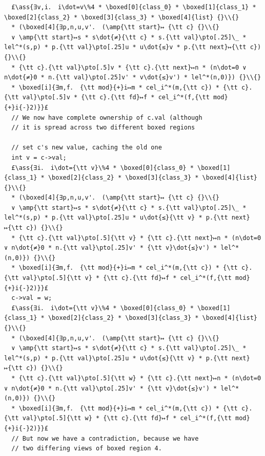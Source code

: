 \documentclass[12pt,a4paper]{article}
\makeatletter
\newcommand{\ml}[2][t]{\mbox{\mdseries\begin{tabular}[#1]{@{}L@{}}#2\end{tabular}}}
\newcommand{\ass}[1]{\ensuremath{{\color{blue}\left\{\ml[c]{#1}\right\}}}}
\makeatother
\begin{document}
\begin{lstlisting}
  £\ass{∃v,i． i\dot=v\%4 * \boxed[0]{class_0} * \boxed[1]{class_1} * \boxed[2]{class_2} * \boxed[3]{class_3} * \boxed[4]{list} {}\\{}
  * (\boxed[4]{∃p,n,u,v'． (\amp{\tt start}↦ {\tt c} {}\\{}
  ∨ \amp{\tt start}↦s * s\dot{≠}{\tt c} * s.{\tt val}\pto[.25]\_ * lel^*(s,p) * p.{\tt val}\pto[.25]u * u\dot{≤}v * p.{\tt next}↦{\tt c}) {}\\{}
  * {\tt c}.{\tt val}\pto[.5]v * {\tt c}.{\tt next}↦n * (n\dot=0 ∨ n\dot{≠}0 * n.{\tt val}\pto[.25]v' * v\dot{≤}v') * lel^*(n,0)}) {}\\{}
  * \boxed[i]{∃m,f． {\tt mod}{+}i↦m * cel_i^*(m,{\tt c}) * {\tt c}.{\tt val}\pto[.5]v * {\tt c}.{\tt fd}↦f * cel_i^*(f,{\tt mod}{+}i{-}2)}}£
  // We now have complete ownership of c.val (although
  // it is spread across two different boxed regions

  // set c's new value, caching the old one
  int v = c->val;
  £\ass{∃i． i\dot={\tt v}\%4 * \boxed[0]{class_0} * \boxed[1]{class_1} * \boxed[2]{class_2} * \boxed[3]{class_3} * \boxed[4]{list} {}\\{}
  * (\boxed[4]{∃p,n,u,v'． (\amp{\tt start}↦ {\tt c} {}\\{}
  ∨ \amp{\tt start}↦s * s\dot{≠}{\tt c} * s.{\tt val}\pto[.25]\_ * lel^*(s,p) * p.{\tt val}\pto[.25]u * u\dot{≤}{\tt v} * p.{\tt next}↦{\tt c}) {}\\{}
  * {\tt c}.{\tt val}\pto[.5]{\tt v} * {\tt c}.{\tt next}↦n * (n\dot=0 ∨ n\dot{≠}0 * n.{\tt val}\pto[.25]v' * {\tt v}\dot{≤}v') * lel^*(n,0)}) {}\\{}
  * \boxed[i]{∃m,f． {\tt mod}{+}i↦m * cel_i^*(m,{\tt c}) * {\tt c}.{\tt val}\pto[.5]{\tt v} * {\tt c}.{\tt fd}↦f * cel_i^*(f,{\tt mod}{+}i{-}2)}}£
  c->val = w;
  £\ass{∃i． i\dot={\tt v}\%4 * \boxed[0]{class_0} * \boxed[1]{class_1} * \boxed[2]{class_2} * \boxed[3]{class_3} * \boxed[4]{list} {}\\{}
  * (\boxed[4]{∃p,n,u,v'． (\amp{\tt start}↦ {\tt c} {}\\{}
  ∨ \amp{\tt start}↦s * s\dot{≠}{\tt c} * s.{\tt val}\pto[.25]\_ * lel^*(s,p) * p.{\tt val}\pto[.25]u * u\dot{≤}{\tt v} * p.{\tt next}↦{\tt c}) {}\\{}
  * {\tt c}.{\tt val}\pto[.5]{\tt w} * {\tt c}.{\tt next}↦n * (n\dot=0 ∨ n\dot{≠}0 * n.{\tt val}\pto[.25]v' * {\tt v}\dot{≤}v') * lel^*(n,0)}) {}\\{}
  * \boxed[i]{∃m,f． {\tt mod}{+}i↦m * cel_i^*(m,{\tt c}) * {\tt c}.{\tt val}\pto[.5]{\tt w} * {\tt c}.{\tt fd}↦f * cel_i^*(f,{\tt mod}{+}i{-}2)}}£
  // But now we have a contradiction, because we have 
  // two differing views of boxed region 4.
  

\end{lstlisting}
\end{document}
